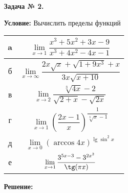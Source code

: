 \documentclass[12pt]{article}
\begin{document}
\newpage
\begin{center}
\textbf{Задача № 2.}   
\end{center}

\textbf{Условие:}
Вычислить пределы функций
\begin{table}[h]
    \centering
    \begin{tabular}{|c|c|}
        \hline
         a & $\lim\limits_{x\rightarrow 1} \dfrac{x^3+5x^2+3x-9}{x^3+4x^2-4x-1}$ \\
         \hline
         б & $\lim\limits_{x\rightarrow\infty} \dfrac{2x\sqrt{x} + \sqrt{1+9x^3}+x}{3x\sqrt{x+10}}$ \\
         \hline
         в & $\lim\limits_{x\rightarrow 2} \dfrac{\sqrt[3]{4x}-2}{\sqrt{2+x}-\sqrt{2x}}$\\
         \hline
         г & $\lim\limits_{x\rightarrow 1} (\dfrac{2x-1}{x})^{\dfrac{1}{\sqrt[3]{x}-1}}  $\\
         \hline
         д & $\lim\limits_{x\rightarrow 0} ({\arccos{4x}})^{\lg{\sin^2{x}}}$ \\
         \hline
         е & $\lim\limits_{x\rightarrow 1} \dfrac{3^{5x-3} - 3^{2x^{2}}}{\tg(\pi x)}$\\
         \hline
    \end{tabular}
\end{table}

\textbf{Решение:}
\end{document}
